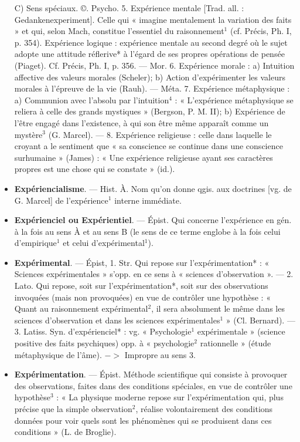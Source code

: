 \begin{itemize}[leftmargin=1cm, label=, itemsep=1pt]
C) Sens spéciaux. ©. Psycho.
5. Expérience mentale [Trad. all. :
Gedankenexperiment]. Celle qui
« imagine mentalement la variation
des faits » et qui, selon Mach, constitue l'essentiel du raisonnement$^1$
(cf. Précis, Ph. I, p. 354). Expérience logique : expérience mentale
au second degré où le sujet adopte
une attitude réflerive* à l'égard de
ses propres opérations de pensée
(Piaget). Cf. Précis, Ph. I, p. 356. —
Mor. 6. Expérience morale : a) Intuition affective des valeurs morales
(Scheler); b) Action d’expérimenter
les valeurs morales à l'épreuve de
la vie (Rauh). — Méta. 7. Expérience métaphysique : a) Communion
avec l'absolu par l'intuition$^4$ :
« L'expérience métaphysique se
reliera à celle des grands mystiques »
(Bergson, P. M. II); b) Expérience
de l’être engagé dans l'existence, à
qui son être même apparaît comme
un mystère$^3$ (G. Marcel). — 8. Expérience religieuse : celle dans laquelle
le croyant a le sentiment que « sa
conscience se continue dans une
conscience surhumaine » (James) :
« Une expérience religieuse ayant ses
caractères propres est une chose
qui se constate » (id.).

\item {\bf Expériencialisme}. — Hist. À. Nom
qu’on donne qgis. aux doctrines
[vg. de G. Marcel] de l'expérience$^1$
interne immédiate.

\item {\bf Expérienciel ou Expérientiel}. — Épist.
Qui concerne l'expérience en gén. à
la fois au sens À et au sens B (le sens
de ce terme englobe à la fois celui
d’empirique$^1$ et celui d'expérimental$^1$).

\item {\bf Expérimental}. — Épist, 1. Str. Qui
repose sur l’expérimentation* :
« Sciences expérimentales » s’opp.
en ce sens à « sciences d’observation ». — 2. Lato. Qui repose, soit
sur l’expérimentation*, soit sur des
observations invoquées (mais non
provoquées) en vue de contrôler une
hypothèse : « Quant au raisonnement
expérimental$^2$, il sera absolument le même dans les sciences
d'observation et dans les sciences
expérimentales$^1$ » (Cl. Bernard). —
3. Latiss. Syn. d'expérienciel* : vg.
« Psychologie$^1$ expérimentale »
(science positive des faits psychiques) opp. à « psychologie$^2$ rationnelle » (étude métaphysique de
l'âme). $->$ Impropre au sens 3.

\item {\bf Expérimentation}. — Épist. Méthode
scientifique qui consiste à provoquer
des observations, faites dans des conditions spéciales, en vue de contrôler
une hypothèse$^3$ : « La physique
moderne repose sur l'expérimentation qui, plus précise que la
simple observation$^2$, réalise volontairement des conditions données
pour voir quels sont les phénomènes
qui se produisent dans ces conditions » (L. de Broglie).


\end{itemize}
